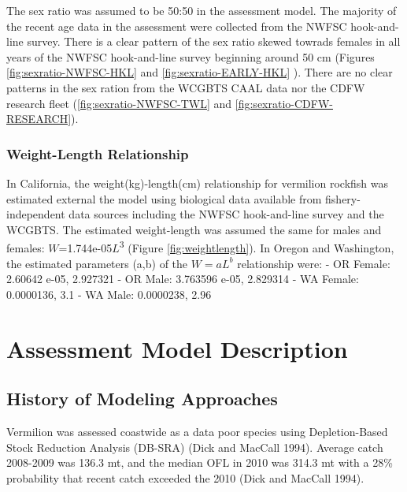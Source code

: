 \documentclass[
  english,
  a4paper,
]{article}
\begin{document}
The sex ratio was assumed to be 50:50 in the assessment model. The majority of the recent age data in the assessment were collected from the NWFSC hook-and-line survey. There is a clear pattern of the sex ratio skewed towrads females in all years of the NWFSC hook-and-line survey beginning around 50 cm (Figures \ref{fig:sexratio-NWFSC-HKL} and \ref{fig:sexratio-EARLY-HKL} ). There are no clear patterns in the sex ration from the WCGBTS CAAL data nor the CDFW research fleet (\ref{fig:sexratio-NWFSC-TWL} and \ref{fig:sexratio-CDFW-RESEARCH}).

\hypertarget{weight-length-relationship}{%
\subsubsection{Weight-Length Relationship}\label{weight-length-relationship}}

In California, the weight(kg)-length(cm) relationship for vermilion rockfish was estimated external the
model using biological data available from fishery-independent
data sources including the NWFSC hook-and-line survey and the WCGBTS. The estimated
weight-length was assumed the same for males and females:
\(W\)=1.744e-05\(L\)\textsuperscript{3}
(Figure \ref{fig:weightlength}).
In Oregon and Washington, the estimated parameters (a,b) of the \(W=aL^b\) relationship were:
- OR Female: 2.60642 e-05, 2.927321
- OR Male: 3.763596 e-05, 2.829314
- WA Female: 0.0000136, 3.1
- WA Male: 0.0000238, 2.96

\hypertarget{assessment-model-description}{%
\section{Assessment Model Description}\label{assessment-model-description}}

\hypertarget{history-of-modeling-approaches}{%
\subsection{History of Modeling Approaches}\label{history-of-modeling-approaches}}

Vermilion was assessed coastwide as a data poor species using
Depletion-Based Stock Reduction Analysis (DB-SRA) (Dick and MacCall 1994). Average catch
2008-2009 was 136.3 mt, and the median OFL in 2010 was 314.3 mt with a 28\%
probability that recent catch exceeded the 2010 (Dick and MacCall 1994).
\end{document}
